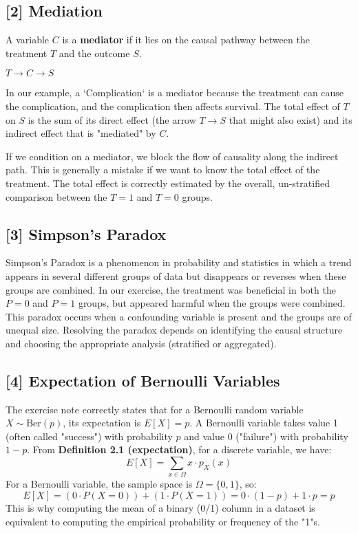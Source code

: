 \documentclass[11pt,a4paper]{article}
\begin{document}
\subsection{\hypertarget{sec:mediation}{[2] Mediation}}
A variable $C$ is a \textbf{mediator} if it lies on the causal pathway between the treatment $T$ and the outcome $S$.
\begin{center}
    $T \to C \to S$
\end{center}
In our example, a `Complication` is a mediator because the treatment can cause the complication, and the complication then affects survival. The total effect of $T$ on $S$ is the sum of its direct effect (the arrow $T \to S$ that might also exist) and its indirect effect that is "mediated" by $C$.

If we condition on a mediator, we block the flow of causality along the indirect path. This is generally a mistake if we want to know the total effect of the treatment. The total effect is correctly estimated by the overall, un-stratified comparison between the $T=1$ and $T=0$ groups.

\subsection{\hypertarget{sec:simpson_paradox}{[3] Simpson's Paradox}}
Simpson's Paradox is a phenomenon in probability and statistics in which a trend appears in several different groups of data but disappears or reverses when these groups are combined. In our exercise, the treatment was beneficial in both the $P=0$ and $P=1$ groups, but appeared harmful when the groups were combined. This paradox occurs when a confounding variable is present and the groups are of unequal size. Resolving the paradox depends on identifying the causal structure and choosing the appropriate analysis (stratified or aggregated).

\subsection{\hypertarget{sec:exp_bern}{[4] Expectation of Bernoulli Variables}}
The exercise note correctly states that for a Bernoulli random variable $X \sim \text{Ber}(p)$, its expectation is $E[X] = p$.
A Bernoulli variable takes value 1 (often called "success") with probability $p$ and value 0 ("failure") with probability $1-p$.
From \textbf{Definition 2.1 (expectation)}, for a discrete variable, we have:
$$ E[X] = \sum_{x \in \Omega} x \cdot p_X(x) $$
For a Bernoulli variable, the sample space is $\Omega = \{0, 1\}$, so:
$$ E[X] = (0 \cdot P(X=0)) + (1 \cdot P(X=1)) = 0 \cdot (1-p) + 1 \cdot p = p $$
This is why computing the mean of a binary (0/1) column in a dataset is equivalent to computing the empirical probability or frequency of the "1"s.
\end{document}
